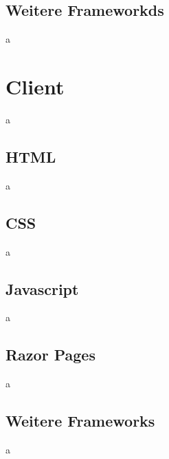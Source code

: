     \subsection{Weitere Frameworkds}
    a

\section{Client}
a

    \subsection{HTML}
    a

    \subsection{CSS}
    a

    \subsection{Javascript}
    a

    \subsection{Razor Pages}
    a

    \subsection{Weitere Frameworks}
    a   